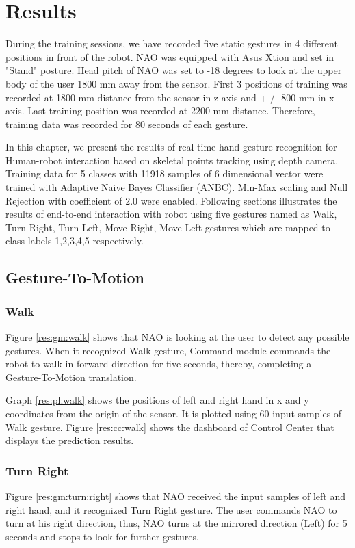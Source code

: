 \chapter{Results} \label{ch:result}
During the training sessions, we have recorded five static gestures in 4 different positions in front of the robot. NAO was equipped with Asus Xtion and set in "Stand" posture. Head pitch of NAO was set to -18 degrees to look at the upper body of the user 1800 mm away from the sensor. First 3 positions of training was recorded at 1800 mm distance from the sensor in z axis and + /- 800 mm in x axis. Last training position was recorded at 2200 mm distance. Therefore, training data was recorded for 80 seconds of each gesture.

In this chapter, we present the results of real time hand gesture recognition for Human-robot interaction based on skeletal points tracking using depth camera. Training data for 5 classes with 11918 samples of 6 dimensional vector were trained with Adaptive Naive Bayes Classifier (ANBC). Min-Max scaling and Null Rejection with coefficient of 2.0 were enabled. Following sections illustrates the results of end-to-end interaction with robot using five gestures named as  Walk, Turn Right, Turn Left, Move Right, Move Left gestures which are mapped to class labels 1,2,3,4,5 respectively.

\section{Gesture-To-Motion}
\subsection{Walk} Figure \ref{res:gm:walk} shows that NAO is looking at the user to detect any possible gestures. When it recognized Walk gesture, Command module commands the robot to walk in forward direction for five seconds, thereby, completing a Gesture-To-Motion translation.



Graph \ref{res:pl:walk} shows the positions of left and right hand in x and y coordinates from the origin of the sensor. It is plotted using 60 input samples of Walk gesture. Figure \ref{res:cc:walk} shows the dashboard of Control Center that displays the prediction results. 

\clearpage
\subsection{Turn Right}
 Figure \ref{res:gm:turn:right} shows that NAO received the input samples of left and right hand, and it recognized Turn Right gesture. The user commands NAO to turn at his right direction, thus, NAO turns at the mirrored direction (Left) for 5 seconds and stops to look for further gestures.

